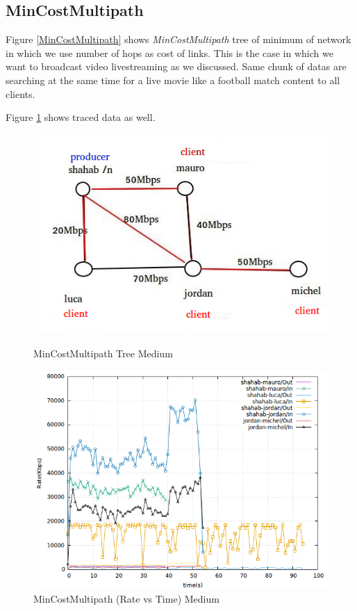 \subsection{MinCostMultipath}
Figure \ref{MinCostMultipath} shows \textit{MinCostMultipath} tree of minimum of network in which we use number of hops as cost of links. This is the case in which we want to broadcast video livestreaming as we discussed. Same chunk of datas are searching at the same time for a live movie like a football match content to all clients.
 
Figure \ref{mincost} shows traced data as well.
\begin{figure}[H]

\begin{center}

\includegraphics[scale = 0.4]{Figures/MinCostMultipath.png}

\caption{MinCostMultipath Tree Medium} \label{MinCostMultipath} 

\includegraphics[scale = 0.4]{Figures/mincostmultipath.png}
\caption{MinCostMultipath (Rate vs Time) Medium} \label{mincost} 

\end{center}

\end{figure}

